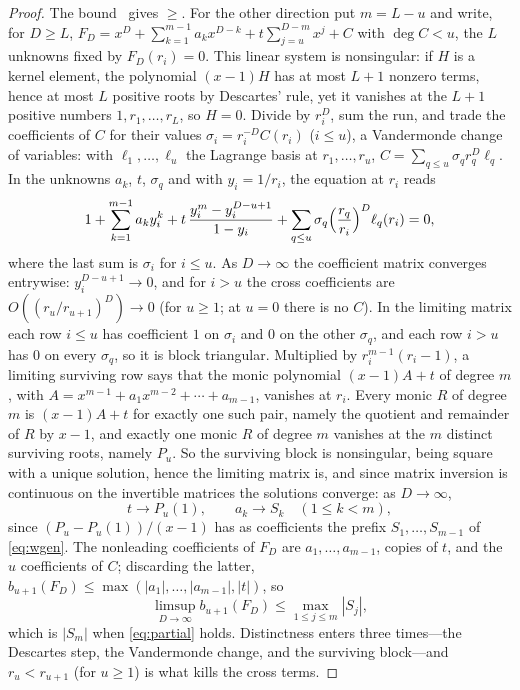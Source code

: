 \documentclass[11pt]{article}
\theoremstyle{definition}
\theoremstyle{plain}
\begin{document}
\begin{proof}
The bound~\cite[Theorem~3.2]{coefficient-mass} gives $\ge$.  For the other direction put $m=L-u$ and write, for $D\ge L$,
$F_D=x^D+\sum_{k=1}^{m-1}a_kx^{D-k}+t\sum_{j=u}^{D-m}x^j+C$ with $\deg C<u$,
the $L$ unknowns fixed by $F_D(r_i)=0$.  This linear system is
nonsingular: if $H$ is a kernel element, the polynomial $(x-1)H$ has at most
$L+1$ nonzero terms, hence at most $L$ positive roots by Descartes' rule,
yet it vanishes at the $L+1$ positive numbers $1,r_1,\ldots,r_L$, so $H=0$.
Divide by $r_i^D$, sum the run, and trade the coefficients of $C$ for their
values $\sigma_i=r_i^{-D}C(r_i)$ ($i\le u$), a Vandermonde change of
variables: with $\ell_1,\ldots,\ell_u$ the Lagrange basis at $r_1,\ldots,r_u$,
$C=\sum_{q\le u}\sigma_qr_q^D\ell_q$.  In the unknowns $a_k$, $t$, $\sigma_q$
and with $y_i=1/r_i$, the equation at $r_i$ reads
\[
  1+\sum_{k=1}^{m-1}a_ky_i^k+t\,\frac{y_i^m-y_i^{D-u+1}}{1-y_i}
  +\sum_{q\le u}\sigma_q\Bigl(\frac{r_q}{r_i}\Bigr)^D\ell_q(r_i)=0 ,
\]
where the last sum is $\sigma_i$ for $i\le u$.  As $D\to\infty$ the
coefficient matrix converges entrywise: $y_i^{D-u+1}\to0$, and for $i>u$ the
cross coefficients are $O((r_u/r_{u+1})^D)\to0$ (for $u\ge1$; at $u=0$ there
is no $C$).  In the limiting matrix
each row $i\le u$ has coefficient $1$ on $\sigma_i$ and $0$ on the other
$\sigma_q$, and each row $i>u$ has $0$ on every $\sigma_q$, so it is block
triangular.  Multiplied by $r_i^{m-1}(r_i-1)$, a limiting surviving row says
that the monic polynomial $(x-1)A+t$ of degree $m$, with
$A=x^{m-1}+a_1x^{m-2}+\cdots+a_{m-1}$, vanishes at $r_i$.  Every monic $R$ of
degree $m$ is $(x-1)A+t$ for exactly one such pair, namely the quotient and
remainder of $R$ by $x-1$, and exactly one monic $R$ of degree $m$ vanishes
at the $m$ distinct surviving roots, namely $P_u$.  So the surviving block
is nonsingular, being square with a unique solution, hence the
limiting matrix is, and since matrix inversion is
continuous on the invertible matrices the solutions converge: as
$D\to\infty$,
\[
  t\to P_u(1),\qquad
  a_k\to S_k\quad(1\le k<m),
\]
since $(P_u-P_u(1))/(x-1)$ has as coefficients the prefix
$S_1,\ldots,S_{m-1}$ of \eqref{eq:wgen}.  The nonleading coefficients of
$F_D$ are $a_1,\ldots,a_{m-1}$, copies of $t$, and the $u$ coefficients of
$C$; discarding the latter, $b_{u+1}(F_D)\le\max(|a_1|,\ldots,|a_{m-1}|,|t|)$,
so
\[
  \limsup_{D\to\infty}b_{u+1}(F_D)\le\max_{1\le j\le m}|S_j|,
\]
which is $|S_m|$ when \eqref{eq:partial} holds.  Distinctness enters three
times---the Descartes step, the Vandermonde change, and the surviving
block---and $r_u<r_{u+1}$ (for $u\ge1$) is what kills the cross terms.
\end{proof}
\end{document}
